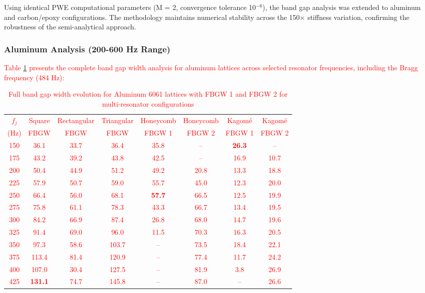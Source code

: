 \documentclass[review,numbers,sort&compress]{elsarticle}
\begin{document}
Using identical PWE computational parameters (M = 2, convergence tolerance 10$^{-6}$), the band gap analysis was extended to aluminum and carbon/epoxy configurations. The methodology maintains numerical stability across the 150× stiffness variation, confirming the robustness of the semi-analytical approach.

\subsubsection{Aluminum Analysis (200-600 Hz Range)}

\textcolor{red}{Table \ref{tab:aluminum_results} presents the complete band gap width analysis for aluminum lattices across selected resonator frequencies, including the Bragg frequency (484 Hz):}

\textcolor{red}{\begin{table}[!htb]
\centering
\caption{Full band gap width evolution for Aluminum 6061 lattices with FBGW 1 and FBGW 2 for multi-resonator configurations\protect\footnotemark[1]}
\label{tab:aluminum_results}
\small
\begin{tabular}{cccccccc}
\hline
$f_j$ & Square & Rectangular & Triangular & Honeycomb & Honeycomb & Kagom\'{e} & Kagom\'{e} \\
(Hz) & FBGW & FBGW & FBGW & FBGW 1 & FBGW 2 & FBGW 1 & FBGW 2 \\
\hline
150 & 36.1 & 33.7 & 36.4 & 35.8 & -- & \textbf{26.3} & -- \\
175 & 43.2 & 39.2 & 43.8 & 42.5 & -- & 16.9 & 10.7 \\
200 & 50.4 & 44.9 & 51.2 & 49.2 & 20.8 & 13.3 & 18.8 \\
225 & 57.9 & 50.7 & 59.0 & 55.7 & 45.0 & 12.3 & 20.0 \\
250 & 66.4 & 56.0 & 68.1 & \textbf{57.7} & 66.5 & 12.5 & 19.9 \\
275 & 75.8 & 61.1 & 78.3 & 43.3 & 66.7 & 13.4 & 19.5 \\
300 & 84.2 & 66.9 & 87.4 & 26.8 & 68.0 & 14.7 & 19.6 \\
325 & 91.4 & 69.0 & 96.0 & 11.5 & 70.3 & 16.3 & 20.5 \\
350 & 97.3 & 58.6 & 103.7 & -- & 73.5 & 18.4 & 22.1 \\
375 & 113.4 & 81.4 & 120.9 & -- & 77.4 & 11.7 & 24.2 \\
400 & 107.0 & 30.4 & 127.5 & -- & 81.9 & 3.8 & 26.9 \\
425 & \textbf{131.1} & 74.7 & 145.8 & -- & 87.0 & -- & 26.6 \\

\end{tabular}
\end{table}}
\end{document}

